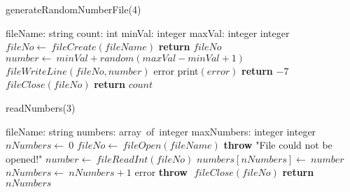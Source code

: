 \documentclass[a4paper,10pt]{article}
\begin{document}
\begin{algorithm}
\caption{generateRandomNumberFile(4)}
\begin{algorithmic}[5]
\State {}
\State {}
\State {}
\State {}
    \State fileName: string
    \State count: int
    \State minVal: integer
    \State maxVal: integer
  \EndDecl
    \State integer
  \EndDecl
  \State \(fileNo\gets\ fileCreate(fileName)\)
    \State \textbf{return} \(fileNo\)
  \EndIf
  \Try
      \State \(number\gets\ minVal+random(maxVal-minVal+1)\)
      \State \(fileWriteLine(fileNo,number)\)
    \EndFor
  \EndTry
  \Catch error
    \State \(\)print\((error)\)
    \State \textbf{return} \(-7\)
  \EndCatch %
  \Finally
    \State \(fileClose(fileNo)\)
  \EndFinally
  \State \textbf{return} \(count\)
\EndFunction
\end{algorithmic}
\end{algorithm}


\begin{algorithm}
\caption{readNumbers(3)}
\begin{algorithmic}[5]
\State {}
\State {}
\State {}
    \State fileName: string
    \State numbers: array\ of\ integer
    \State maxNumbers: integer
  \EndDecl
    \State integer
  \EndDecl
  \State \(nNumbers\gets\ 0\)
  \State \(fileNo\gets\ fileOpen(fileName)\)
    \State \textbf{throw} \(\)"{}File could not be opened!"{}\(\)
  \EndIf
  \Try
      \State \(number\gets\ fileReadInt(fileNo)\)
      \State \(numbers[nNumbers]\gets\ number\)
      \State \(nNumbers\gets\ nNumbers+1\)
    \EndWhile
  \EndTry
  \Catch error
    \State \textbf{throw} \(\)
  \EndCatch %
  \Finally
    \State \(fileClose(fileNo)\)
  \EndFinally
  \State \textbf{return} \(nNumbers\)
\EndFunction
\end{algorithmic}
\end{algorithm}
\end{document}
